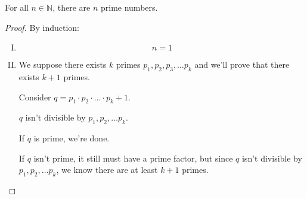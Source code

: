 \documentclass[00_complete]{subfiles}
\begin{document}
\begin{example}
    For all $n \in \mathbb{N}$, there are $n$ prime numbers.
    \begin{proof}
        By induction:
        \begin{enumerate}[I.]
            \item \begin{equation}
                n=1 \tag{\checkmark}
            \end{equation}
            \item We suppose there exists $k$ primes $p_1,p_2,p_3,\dots
                p_k$ and we'll prove that there exists $k+1$ primes.

                Consider $q=p_1\cdot p_2 \cdot \ldots \cdot p_k+1$.

                $q$ isn't divisible by $p_1,p_2,\dots p_k$.

                If $q$ is prime, we're done.

                If $q$ isn't prime, it still must have a prime factor, but
                since $q$ isn't divisible by $p_1,p_2,\dots p_k$, we know there
                are at least $k+1$ primes.
        \end{enumerate}
    \end{proof}
\end{example}
\end{document}
